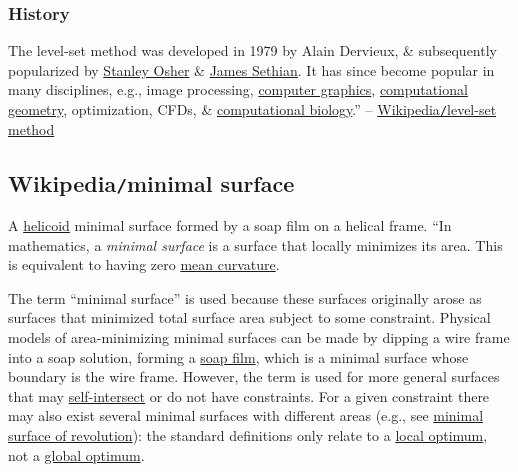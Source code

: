 \documentclass{article}
\begin{document}
\subsubsection{History}
The level-set method was developed in 1979 by {\sc Alain Dervieux}, \& subsequently popularized by \href{https://en.wikipedia.org/wiki/Stanley_Osher}{\sc Stanley Osher} \& \href{https://en.wikipedia.org/wiki/James_Sethian}{\sc James Sethian}. It has since become popular in many disciplines, e.g., image processing, \href{https://en.wikipedia.org/wiki/Computer_graphics}{computer graphics}, \href{https://en.wikipedia.org/wiki/Computational_geometry}{computational geometry}, optimization, CFDs, \& \href{https://en.wikipedia.org/wiki/Computational_biology}{computational biology}.'' -- \href{https://en.wikipedia.org/wiki/Level-set_method}{Wikipedia{\tt/}level-set method}


\subsection{Wikipedia{\tt/}minimal surface}
{\sf A \href{https://en.wikipedia.org/wiki/Helicoid}{helicoid} minimal surface formed by a soap film on a helical frame.} ``In mathematics, a {\it minimal surface} is a surface that locally minimizes its area. This is equivalent to having zero \href{https://en.wikipedia.org/wiki/Mean_curvature}{mean curvature}.

The term ``minimal surface'' is used because these surfaces originally arose as surfaces that minimized total surface area subject to some constraint. Physical models of area-minimizing minimal surfaces can be made by dipping a wire frame into a soap solution, forming a \href{https://en.wikipedia.org/wiki/Soap_film}{soap film}, which is a minimal surface whose boundary is the wire frame. However, the term is used for more general surfaces that may \href{https://en.wikipedia.org/wiki/Immersed_submanifold#Immersed_submanifolds}{self-intersect} or do not have constraints. For a given constraint there may also exist several minimal surfaces with different areas (e.g., see \href{https://en.wikipedia.org/wiki/Minimal_surface_of_revolution}{minimal surface of revolution}): the standard definitions only relate to a \href{https://en.wikipedia.org/wiki/Local_optimum}{local optimum}, not a \href{https://en.wikipedia.org/wiki/Global_optimum}{global optimum}.
\end{document}

